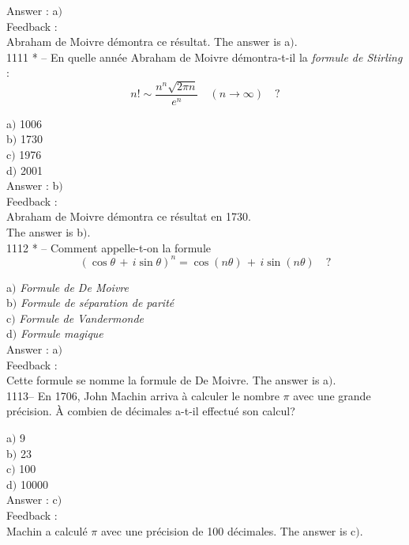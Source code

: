 ﻿\documentclass[letterpaper, 12pt]{article}
\begin{document}
Answer : a$)$\\

Feedback :\\
Abraham de Moivre d\'emontra ce r\'esultat.
The answer is a$)$.\\

1111 * -- En quelle ann\'ee Abraham de Moivre d\'emontra-t-il la
{\sl formule de Stirling} :
$$\displaystyle{n!\sim\frac{n^n\sqrt{2\pi n}}{e^n}\quad(n\to\infty)}\quad?$$

a$)$ 1006  \\
b$)$ 1730 \\
c$)$ 1976  \\
d$)$ 2001\\

Answer : b$)$\\

Feedback :\\
Abraham de Moivre d\'emontra ce r\'esultat en 1730. \\
The answer is b$)$.\\

1112 * -- Comment appelle-t-on la formule
$$(\cos\theta\,+\,i\sin\theta)^n=\cos(n\theta)\,+\,i\sin(n\theta)\quad?$$


a$)$ {\sl Formule de De Moivre} \\
b$)$ {\sl Formule de s\'eparation de parit\'e}  \\
c$)$ {\sl Formule de Vandermonde}  \\
d$)$ {\sl Formule magique}\\

Answer : a$)$\\

Feedback :\\
Cette formule se nomme la formule de De Moivre.
The answer is a$)$.\\

1113-- En 1706, John Machin arriva \`a calculer le nombre $\pi$ avec
une grande pr\'ecision. \`A combien de d\'ecimales a-t-il effectu\'e
son calcul?

a$)$ 9  \\
b$)$ 23 \\
c$)$ 100  \\
d$)$ 10000 \\

Answer : c$)$\\

Feedback :\\
Machin a calcul\'e $\pi$ avec une pr\'ecision de 100 d\'ecimales.
The answer is c$)$.\\
\end{document}
